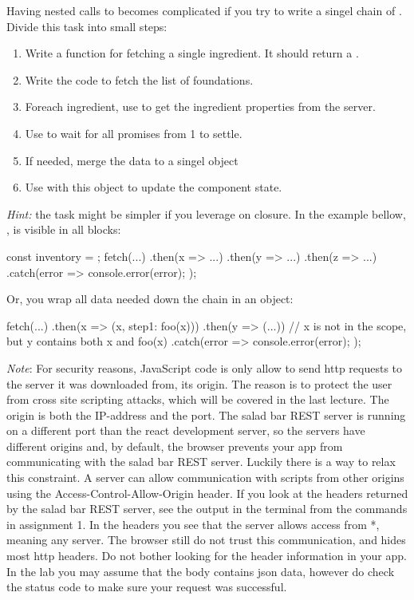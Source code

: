 \documentclass[fleqn, article, a4paper]{memoir}
\begin{document}
\begin{Assignments}
Having nested calls to  becomes complicated if you try to write a singel chain of . Divide this task into small steps:
\begin{enumerate}
\item Write a function for fetching a single ingredient. It should return a .
\item Write the code to fetch the list of foundations.
\item Foreach ingredient, use  to get the ingredient properties from the server.
\item Use  to wait for all promises from 1 to settle.
\item If needed, merge the data to a singel object
\item Use  with this object to update the component state.
\end{enumerate}
\emph{Hint:} the task might be simpler if you leverage on closure. In the example bellow, , is visible in all  blocks:
\begin{Code}
const inventory = {};
fetch(...)
.then(x => {...})
.then(y => {...})
.then(z => {...})
.catch(error => {
  console.error(error);
});
\end{Code}
\noindent Or, you wrap all data needed down the chain in an object:
\begin{Code}
fetch(...)
.then(x => ({x, step1: foo(x)}))
.then(y => (...)) // x is not in the scope, but y contains both x and foo(x)
.catch(error => {
  console.error(error);
});
\end{Code}
\emph{Note}: For security reasons, JavaScript code is only allow to send http requests to the server it was downloaded from, its origin. The reason is to protect the user from cross site scripting attacks, which will be covered in the last lecture. The origin is both the IP-address and the port. The salad bar REST server is running on a different port than the react development server, so the servers have different origins and, by default, the browser prevents your app from communicating with the salad bar REST server. Luckily there is a way to relax this constraint. A server can allow communication with scripts from other origins using the Access-Control-Allow-Origin header. If you look at the headers returned by the salad bar REST server, see the output in the terminal from the  commands in assignment 1. In the headers you see that the server allows access from *, meaning any server. The browser still do not trust this communication, and hides most http headers. Do not bother looking for the header information in your app. In the lab you may assume that the body contains json data, however do check the status code to make sure your request was successful.


\end{Assignments}
\end{document}
